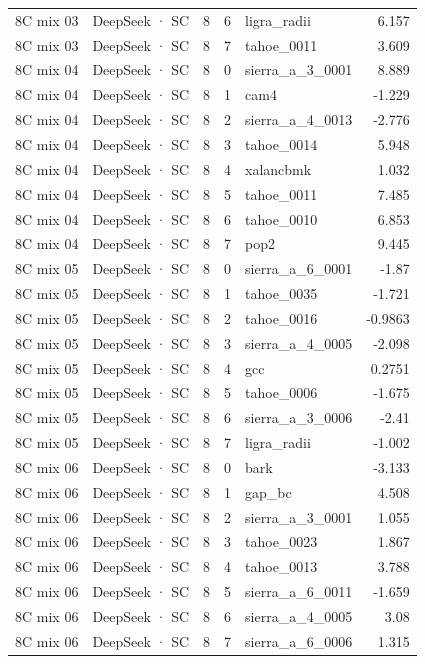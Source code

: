 \begin{tabular}{llrrlr}
8C mix 03 & DeepSeek · SC & 8 & 6 & ligra\_radii & 6.157 \\
8C mix 03 & DeepSeek · SC & 8 & 7 & tahoe\_0011 & 3.609 \\
8C mix 04 & DeepSeek · SC & 8 & 0 & sierra\_a\_3\_0001 & 8.889 \\
8C mix 04 & DeepSeek · SC & 8 & 1 & cam4 & -1.229 \\
8C mix 04 & DeepSeek · SC & 8 & 2 & sierra\_a\_4\_0013 & -2.776 \\
8C mix 04 & DeepSeek · SC & 8 & 3 & tahoe\_0014 & 5.948 \\
8C mix 04 & DeepSeek · SC & 8 & 4 & xalancbmk & 1.032 \\
8C mix 04 & DeepSeek · SC & 8 & 5 & tahoe\_0011 & 7.485 \\
8C mix 04 & DeepSeek · SC & 8 & 6 & tahoe\_0010 & 6.853 \\
8C mix 04 & DeepSeek · SC & 8 & 7 & pop2 & 9.445 \\
8C mix 05 & DeepSeek · SC & 8 & 0 & sierra\_a\_6\_0001 & -1.87 \\
8C mix 05 & DeepSeek · SC & 8 & 1 & tahoe\_0035 & -1.721 \\
8C mix 05 & DeepSeek · SC & 8 & 2 & tahoe\_0016 & -0.9863 \\
8C mix 05 & DeepSeek · SC & 8 & 3 & sierra\_a\_4\_0005 & -2.098 \\
8C mix 05 & DeepSeek · SC & 8 & 4 & gcc & 0.2751 \\
8C mix 05 & DeepSeek · SC & 8 & 5 & tahoe\_0006 & -1.675 \\
8C mix 05 & DeepSeek · SC & 8 & 6 & sierra\_a\_3\_0006 & -2.41 \\
8C mix 05 & DeepSeek · SC & 8 & 7 & ligra\_radii & -1.002 \\
8C mix 06 & DeepSeek · SC & 8 & 0 & bark & -3.133 \\
8C mix 06 & DeepSeek · SC & 8 & 1 & gap\_bc & 4.508 \\
8C mix 06 & DeepSeek · SC & 8 & 2 & sierra\_a\_3\_0001 & 1.055 \\
8C mix 06 & DeepSeek · SC & 8 & 3 & tahoe\_0023 & 1.867 \\
8C mix 06 & DeepSeek · SC & 8 & 4 & tahoe\_0013 & 3.788 \\
8C mix 06 & DeepSeek · SC & 8 & 5 & sierra\_a\_6\_0011 & -1.659 \\
8C mix 06 & DeepSeek · SC & 8 & 6 & sierra\_a\_4\_0005 & 3.08 \\
8C mix 06 & DeepSeek · SC & 8 & 7 & sierra\_a\_6\_0006 & 1.315 \\

\end{tabular}

